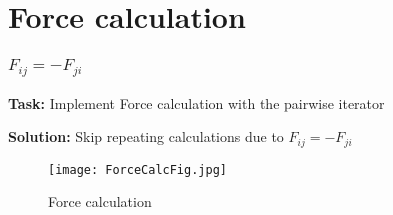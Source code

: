 \section{Force calculation}

\begin{frame}
    \frametitle{$F_{ij} = -F_{ji}$}
    \textbf{Task:} Implement Force calculation with the pairwise iterator

    \textbf{Solution:} Skip repeating calculations due to $F_{ij} = -F_{ji}$

    \begin{figure}[ht]
    \centering
            \texttt{[image: ForceCalcFig.jpg]}
            \caption{Force calculation}
    \end{figure}
\end{frame}